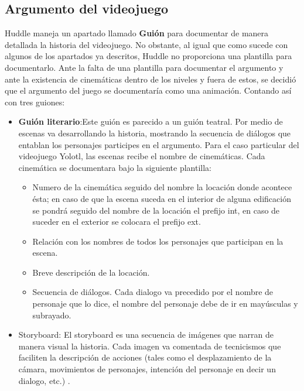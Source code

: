 \subsection{Argumento del videojuego}
Huddle maneja un apartado llamado \textbf{Guión} para documentar de manera detallada 
la historia del videojuego. No obstante, al igual que como sucede con algunos de 
los apartados ya descritos, Huddle no proporciona una plantilla para documentarlo. 
Ante la falta de una plantilla para documentar el argumento y ante la existencia 
de cinemáticas dentro de los niveles y fuera de estos, se decidió que el argumento 
del juego se documentaría como una animación. Contando así con tres guiones:
	\begin{itemize}
		\item \textbf{Guión literario}:Este guión es parecido a un guión teatral. 
		Por medio de escenas va desarrollando la historia, mostrando la secuencia 
		de diálogos que entablan los personajes participes en el argumento. Para 
		el caso particular del videojuego Yolotl, las escenas recibe el nombre de 
		cinemáticas. Cada cinemática se documentara bajo la siguiente plantilla:
			\begin{itemize}
				\item Numero de la cinemática seguido del nombre la locación donde 
				acontece ésta; en caso de que la escena suceda en el interior de 
				alguna edificación se pondrá seguido del nombre de la locación el 
				prefijo int, en caso de suceder en el exterior se colocara el 
				prefijo ext.
				\item Relación con los nombres de todos los personajes que participan 
				en la escena.
				\item Breve descripción de la locación.
				\item Secuencia de diálogos. Cada dialogo va precedido por el nombre 
				de personaje que lo dice, el nombre del personaje debe de ir en 
				mayúsculas y subrayado. 
			\end{itemize}
			\item Storyboard: El storyboard es una secuencia de imágenes que narran 
			de manera visual la historia. Cada imagen va comentada de tecnicismos 
			que faciliten la descripción de acciones (tales como el desplazamiento 
			de la cámara, movimientos de personajes, intención del personaje en 
			decir un dialogo, etc.) \cite{RefStoyBoard}.  			 
	\end{itemize}